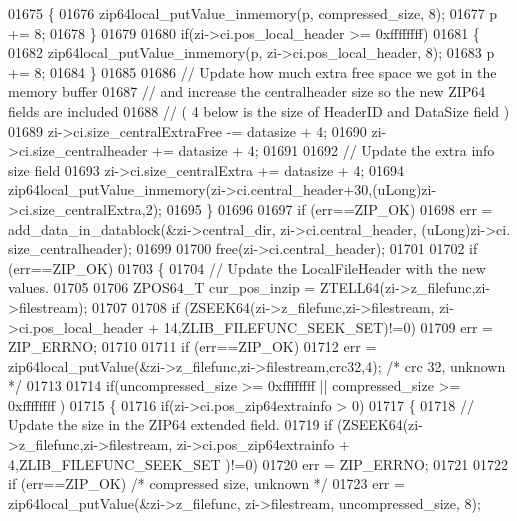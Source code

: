 \begin{DoxyCode}
01675       \{
01676         zip64local\_putValue\_inmemory(p, compressed\_size, 8);
01677         p += 8;
01678       \}
01679 
01680       \textcolor{keywordflow}{if}(zi->ci.pos\_local\_header >= 0xffffffff)
01681       \{
01682         zip64local\_putValue\_inmemory(p, zi->ci.pos\_local\_header, 8);
01683         p += 8;
01684       \}
01685 
01686       \textcolor{comment}{// Update how much extra free space we got in the memory buffer}
01687       \textcolor{comment}{// and increase the centralheader size so the new ZIP64 fields are included}
01688       \textcolor{comment}{// ( 4 below is the size of HeaderID and DataSize field )}
01689       zi->ci.size\_centralExtraFree -= datasize + 4;
01690       zi->ci.size\_centralheader += datasize + 4;
01691 
01692       \textcolor{comment}{// Update the extra info size field}
01693       zi->ci.size\_centralExtra += datasize + 4;
01694       zip64local\_putValue\_inmemory(zi->ci.central\_header+30,(uLong)zi->ci.size\_centralExtra,2);
01695     \}
01696 
01697     \textcolor{keywordflow}{if} (err==ZIP\_OK)
01698         err = add\_data\_in\_datablock(&zi->central\_dir, zi->ci.central\_header, (uLong)zi->ci.
      size\_centralheader);
01699 
01700     free(zi->ci.central\_header);
01701 
01702     \textcolor{keywordflow}{if} (err==ZIP\_OK)
01703     \{
01704         \textcolor{comment}{// Update the LocalFileHeader with the new values.}
01705 
01706         ZPOS64\_T cur\_pos\_inzip = ZTELL64(zi->z\_filefunc,zi->filestream);
01707 
01708         \textcolor{keywordflow}{if} (ZSEEK64(zi->z\_filefunc,zi->filestream, zi->ci.pos\_local\_header + 14,ZLIB\_FILEFUNC\_SEEK\_SET)!=0)
01709             err = ZIP\_ERRNO;
01710 
01711         \textcolor{keywordflow}{if} (err==ZIP\_OK)
01712             err = zip64local\_putValue(&zi->z\_filefunc,zi->filestream,crc32,4); \textcolor{comment}{/* crc 32, unknown */}
01713 
01714         \textcolor{keywordflow}{if}(uncompressed\_size >= 0xffffffff || compressed\_size >= 0xffffffff )
01715         \{
01716           \textcolor{keywordflow}{if}(zi->ci.pos\_zip64extrainfo > 0)
01717           \{
01718             \textcolor{comment}{// Update the size in the ZIP64 extended field.}
01719             \textcolor{keywordflow}{if} (ZSEEK64(zi->z\_filefunc,zi->filestream, zi->ci.pos\_zip64extrainfo + 4,ZLIB\_FILEFUNC\_SEEK\_SET
      )!=0)
01720               err = ZIP\_ERRNO;
01721 
01722             \textcolor{keywordflow}{if} (err==ZIP\_OK) \textcolor{comment}{/* compressed size, unknown */}
01723               err = zip64local\_putValue(&zi->z\_filefunc, zi->filestream, uncompressed\_size, 8);

\end{DoxyCode}
